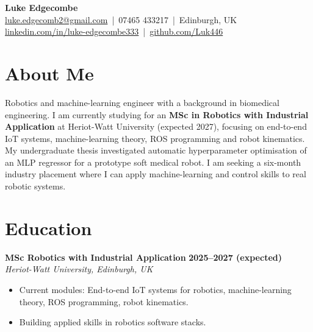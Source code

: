 \documentclass[a4paper,11pt]{article}
\begin{document}
\begin{center}
    {\LARGE \textbf{Luke Edgecombe}} \\[4pt]
    \href{mailto:luke.edgecomb2@gmail.com}{luke.edgecomb2@gmail.com} \,|\, 07465 433217 \,|\, Edinburgh, UK \\
    \href{https://linkedin.com/in/luke-edgecombe333}{linkedin.com/in/luke-edgecombe333} \,|\, 
    \href{https://github.com/Luk446}{github.com/Luk446}
\end{center}

\vspace{0.3cm}


\section*{About Me}
Robotics and machine-learning engineer with a background in biomedical engineering. I am currently studying for an \textbf{MSc in Robotics with Industrial Application} at Heriot-Watt University (expected 2027), focusing on end-to-end IoT systems, machine-learning theory, ROS programming and robot kinematics. My undergraduate thesis investigated automatic hyperparameter optimisation of an MLP regressor for a prototype soft medical robot. I am seeking a six-month industry placement where I can apply machine-learning and control skills to real robotic systems.


\section*{Education}

\textbf{MSc Robotics with Industrial Application} \hfill \textbf{2025--2027 (expected)}\\
    \textit{Heriot-Watt University, Edinburgh, UK}
\begin{itemize}
    \item Current modules: End-to-end IoT systems for robotics, machine-learning theory, ROS programming, robot kinematics.
    \item Building applied skills in robotics software stacks.
\end{itemize}
\end{document}
